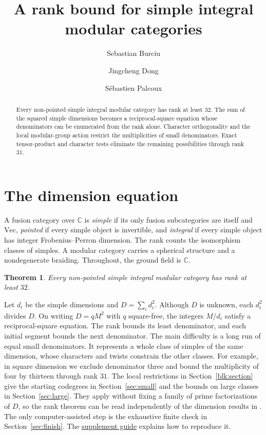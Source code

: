 \documentclass[11pt]{amsart}
\title[A rank bound for simple integral modular categories]{A rank bound for simple integral modular categories}
\author{Sebastian Burciu}
\author{Jingcheng Dong}
\author{S\'ebastien Palcoux}
\date{}
\numberwithin{equation}{section}
\newtheorem*{mainthm}{Theorem}
\newcommand{\supfile}[2]{\href{https://github.com/sebastienpalcoux/WGT-fusion-categories/blob/433d1c45795202991f1693e00d9770e4cccf05f6/papers/rank-bound-supplement/#1}{#2}}
\begin{document}
\begin{abstract}
Every non-pointed simple integral modular category has rank at least $32$.
The sum of the squared simple dimensions becomes a reciprocal-square equation
whose denominators can be enumerated from the rank alone. Character
orthogonality and the local modular-group action restrict the multiplicities
of small denominators. Exact tensor-product and character tests eliminate the
remaining possibilities through rank $31$.
\end{abstract}
\maketitle
\section{The dimension equation}\label{sec:dimensions}
A fusion category over $\mathbb C$ is \emph{simple} if its only fusion
subcategories are itself and $\mathrm{Vec}$, \emph{pointed} if every
simple object is invertible, and \emph{integral} if every simple object
has integer Frobenius--Perron dimension. The rank counts the isomorphism
classes of simples. A modular category carries a spherical structure and
a nondegenerate braiding. Throughout, the ground field is $\mathbb C$.
\begin{mainthm}
Every non-pointed simple integral modular category has rank at least $32$.
\end{mainthm}

Let $d_i$ be the simple dimensions and $D=\sum_i d_i^2$. Although $D$ is
unknown, each $d_i^2$ divides $D$. On writing $D=qM^2$ with $q$ square-free,
the integers $M/d_i$ satisfy a reciprocal-square equation. The rank bounds
its least denominator, and each initial segment bounds the next denominator.
The main difficulty is a long run of equal small denominators. It represents
a whole class of simples of the same dimension, whose characters and twists
constrain the other classes. For example, in square dimension we exclude
denominator three and bound the multiplicity of four by thirteen through
rank $31$. The local restrictions in Section~\ref{blk:section} give the starting
codegrees in Section~\ref{sec:small} and the bounds on large classes in
Section~\ref{sec:large}. They apply without fixing a family of prime
factorizations of $D$, so the rank theorem can be read independently
of the dimension results in \cite{BDP}. The only computer-assisted step
is the exhaustive finite check in Section~\ref{sec:finish}.
The \supfile{README.md}{supplement guide} explains how to reproduce it.
\end{document}
